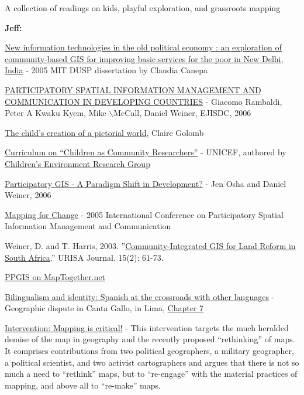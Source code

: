 \documentclass[11pt]{report}
\begin{document}
A collection of readings on kids, playful exploration, and grassroots mapping

\textbf{Jeff:}

\href{http://dspace.mit.edu/handle/1721.1/33012}{New information technologies in the old political economy : an exploration of community-based GIS for improving basic services for the poor in New Delhi, India} - 2005 MIT DUSP dissertation by Claudia Canepa

\href{http://www.ejisdc.org/ojs2/index.php/ejisdc/article/viewFile/237/158}{PARTICIPATORY SPATIAL INFORMATION MANAGEMENT AND COMMUNICATION IN DEVELOPING COUNTRIES} - Giacomo Rambaldi, Peter A Kwaku Kyem, Mike $\backslash$McCall, Daniel Weiner, EJISDC, 2006

\href{http://books.google.com/books?id=4u79ffyzekoC&printsec=frontcover&dq=child%27s+pictorial+world&ei=5EUYS9veGqPqygShs7TVBw#v=onepage&q=&f=false}{The child'{}s creation of a pictorial world}, Claire Golomb

\href{http://www.unicef.org/teachers/researchers/intro.htm}{Curriculum on ``{}Children as Community Researchers''{}} - UNICEF, authored by \href{http://web.gc.cuny.edu/che/cerg/about_cerg/environmental_learning_index.htm}{Children'{}s Environment Research Group}

\href{http://www.directionsmag.com/article.php?article_id=2365&trv=1.}{Participatory GIS - A Paradigm Shift in Development?} - Jen Osha and Daniel Weiner, 2006

\href{http://www.iapad.org/pgis2005/}{Mapping for Change} - 2005 International Conference on Participatory Spatial Information Management and Communication

Weiner, D. and T. Harris, 2003. ''{}\href{http://www.rri.wvu.edu/pdffiles/gisweiner.pdf}{Community-Integrated GIS for Land Reform in South Africa}.''{} URISA Journal. 15(2): 61-73.

\href{http://www.maptogether.net/taxonomy/term/151}{PPGIS on MapTogether.net}

\href{http://books.google.com/books?hl=en&lr=&id=_VK-ABCKlVgC&oi=fnd&pg=PA3&dq=Nino+Bariola&ots=_r1wMwjiou&sig=TH0Gn1P27Xtsdq2Oc0Up5D6HLzg#v=onepage&q=Nino%20Bariola&f=false}{Bilingualism and identity: Spanish at the crossroads with other languages} - Geographic dispute in Canta Gallo, in Lima, \href{http://books.google.com/books?id=_VK-ABCKlVgC&lpg=PA3&ots=_r1wMwjiou&dq=Nino%20Bariola&lr=&pg=PA153#v=onepage&q=&f=true}{Chapter 7}

\href{http://www.sciencedirect.com/science?_ob=ArticleURL&_udi=B6VG2-4XHJX4B-1&_user=10&_coverDate=08/31/2009&_rdoc=1&_fmt=high&_orig=search&_sort=d&_docanchor=&view=c&_searchStrId=1186930669&_rerunOrigin=google&_acct=C000050221&_version=1&_urlVersion=0&_userid=10&md5=a9327ffa62e089e863f892a4551c1717}{Intervention: Mapping is critical!} - This intervention targets the much heralded demise of the map in geography and the recently proposed “rethinking” of maps. It comprises contributions from two political geographers, a military geographer, a political scientist, and two activist cartographers and argues that there is not so much a need to “rethink” maps, but to “re-engage” with the material practices of mapping, and above all to “re-make” maps.
\end{document}
